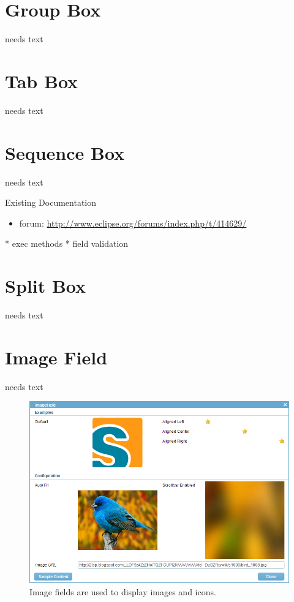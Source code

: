 \documentclass[a4paper,10pt,twoside]{book}
\begin{document}
\section{Group Box}
needs text

\section{Tab Box}
needs text

\section{Sequence Box}
needs text

\noindent Existing Documentation
\begin{itemize}
  \item forum: \url{http://www.eclipse.org/forums/index.php/t/414629/}
\end{itemize}

* exec methods
* field validation


\section{Split Box}
needs text

\section{Image Field}
needs text


\begin{figure}
\includegraphics[width=14cm]{imagefield.png}
\caption{Image fields are used to display images and icons.
}
\end{figure}
\end{document}
